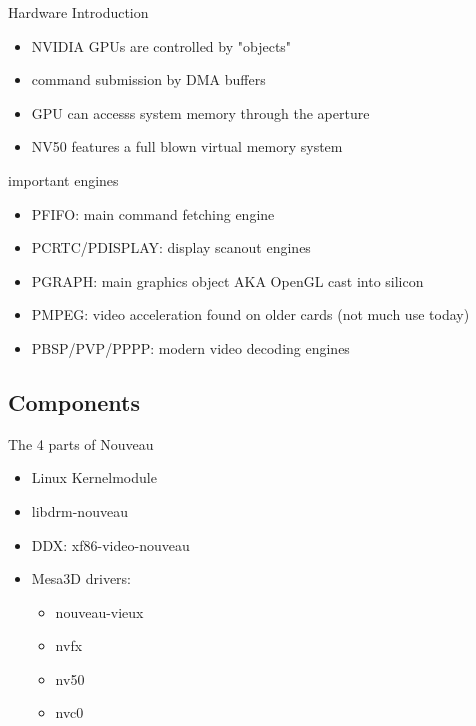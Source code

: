\documentclass[11pt,english,compress]{beamer}
\begin{document}
		\begin{frame}
			\begin{block}{Hardware Introduction}
				\begin{itemize}
					\item NVIDIA GPUs are controlled by "objects"
					\item command submission by DMA buffers
					\item GPU can accesss system memory through the aperture
					\item NV50 features a full blown virtual memory system
				\end{itemize}
			\end{block}
			\begin{block}{important engines}
				\begin{itemize}
					\item PFIFO: main command fetching engine
					\item PCRTC/PDISPLAY: display scanout engines
					\item PGRAPH: main graphics object AKA OpenGL cast into silicon
					\item PMPEG: video acceleration found on older cards (not much use today)
					\item PBSP/PVP/PPPP: modern video decoding engines %
				\end{itemize}
			\end{block}
		\end{frame}

	\subsection{Components}
		\begin{frame}
			\begin{block}{The 4 parts of Nouveau}
				\begin{itemize}
					\item Linux Kernelmodule
					\item libdrm-nouveau
					\item DDX: xf86-video-nouveau
					\item Mesa3D drivers:
						\begin{itemize}
							\item nouveau-vieux
							\item nvfx
							\item nv50
							\item nvc0
						\end{itemize}
				\end{itemize}
			\end{block}
		\end{frame}
\end{document}
